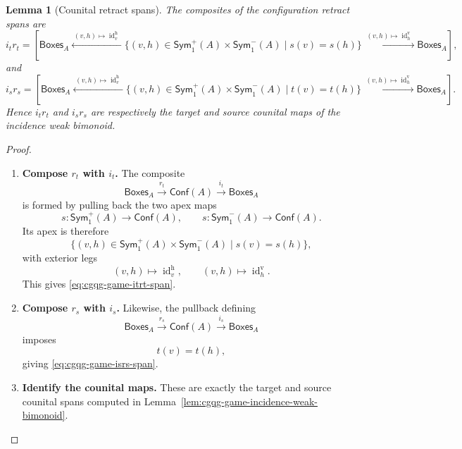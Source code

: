 \documentclass[oneside]{article}
\newcommand{\Boxes}{\mathsf{Boxes}}
\newcommand{\Conf}{\mathsf{Conf}}
\newcommand{\Sym}{\mathsf{Sym}}
\newcommand{\id}{\operatorname{id}}
\theoremstyle{plain}
\newtheorem{lemma}[theorem]{Lemma}
\theoremstyle{definition}
\theoremstyle{remark}
\begin{document}
\begin{lemma}[Counital retract spans]
\label{lem:cgqg-game-counital-retract-spans}
    The composites of the configuration retract spans are
    \begin{equation}
        i_tr_t
        =
        \left[
        \Boxes_A
        \xleftarrow{\;(v,h)\mapsto\id_v^{\mathrm h}\;}
        \bigl\{
            (v,h)\in\Sym^+_1(A)\times\Sym^-_1(A)
            \mid s(v)=s(h)
        \bigr\}
        \xrightarrow{\;(v,h)\mapsto\id_h^{\mathrm v}\;}
        \Boxes_A
        \right],
        \label{eq:cgqg-game-itrt-span}
    \end{equation}
    and
    \begin{equation}
        i_sr_s
        =
        \left[
        \Boxes_A
        \xleftarrow{\;(v,h)\mapsto\id_v^{\mathrm h}\;}
        \bigl\{
            (v,h)\in\Sym^+_1(A)\times\Sym^-_1(A)
            \mid t(v)=t(h)
        \bigr\}
        \xrightarrow{\;(v,h)\mapsto\id_h^{\mathrm v}\;}
        \Boxes_A
        \right].
        \label{eq:cgqg-game-isrs-span}
    \end{equation}
    Hence \(i_tr_t\) and \(i_sr_s\) are respectively the target and source counital maps of the incidence weak bimonoid.
\end{lemma}
\begin{proof}
    \leavevmode
    \begin{enumerate}[beginpenalty=10000]
        \item \textbf{Compose \(r_t\) with \(i_t\).} The composite
        \[
            \Boxes_A
            \xrightarrow{r_t}
            \Conf(A)
            \xrightarrow{i_t}
            \Boxes_A
        \]
        is formed by pulling back the two apex maps
        \[
            s:\Sym^+_1(A)\longrightarrow\Conf(A),
            \qquad
            s:\Sym^-_1(A)\longrightarrow\Conf(A).
        \]
        Its apex is therefore
        \[
            \bigl\{
                (v,h)\in\Sym^+_1(A)\times\Sym^-_1(A)
                \mid s(v)=s(h)
            \bigr\},
        \]
        with exterior legs
        \[
            (v,h)\longmapsto\id_v^{\mathrm h},
            \qquad
            (v,h)\longmapsto\id_h^{\mathrm v}.
        \]
        This gives \eqref{eq:cgqg-game-itrt-span}.

        \item \textbf{Compose \(r_s\) with \(i_s\).} Likewise, the pullback defining
        \[
            \Boxes_A
            \xrightarrow{r_s}
            \Conf(A)
            \xrightarrow{i_s}
            \Boxes_A
        \]
        imposes
        \[
            t(v)=t(h),
        \]
        giving \eqref{eq:cgqg-game-isrs-span}.

        \item \textbf{Identify the counital maps.} These are exactly the target and source counital spans computed in Lemma~\ref{lem:cgqg-game-incidence-weak-bimonoid}. \qedhere
    \end{enumerate}
\end{proof}
\end{document}
